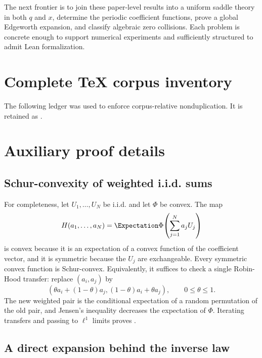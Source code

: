 \documentclass[11pt]{article}
\numberwithin{equation}{section}
\theoremstyle{definition}
\theoremstyle{remark}
\begin{document}
The next frontier is to join these paper-level results into a uniform saddle theory in both
$q$ and $x$, determine the periodic coefficient functions, prove a global Edgeworth expansion,
and classify algebraic zero collisions.  Each problem is concrete enough to support numerical
experiments and sufficiently structured to admit Lean formalization.

\appendix
\renewcommand*{\theHsection}{\arabic{part}.\arabic{section}}

\section{Complete TeX corpus inventory}
\label{p10:app:inventory}

The following ledger was used to enforce corpus-relative nonduplication.  It is retained as
.



\section{Auxiliary proof details}
\label{p10:app:proofs}

\subsection{Schur-convexity of weighted i.i.d. sums}

For completeness, let $U_1,\ldots,U_N$ be i.i.d. and let $\Phi$ be convex.  The map
\[
 H(a_1,\ldots,a_N)=\Expectation\Phi\!\left(\sum_{j=1}^Na_jU_j\right)
\]
is convex because it is an expectation of a convex function of the coefficient vector, and
it is symmetric because the $U_j$ are exchangeable.  Every symmetric convex function is
Schur-convex.  Equivalently, it suffices to check a single Robin-Hood transfer:
replace $(a_i,a_j)$ by
\[
 (\theta a_i+(1-\theta)a_j,
  (1-\theta)a_i+\theta a_j),
 \qquad 0\le\theta\le1.
\]
The new weighted pair is the conditional expectation of a random permutation of the old
pair, and Jensen's inequality decreases the expectation of $\Phi$.  Iterating transfers and
passing to $\ell^1$ limits proves .

\subsection{A direct expansion behind the inverse law}
\end{document}
